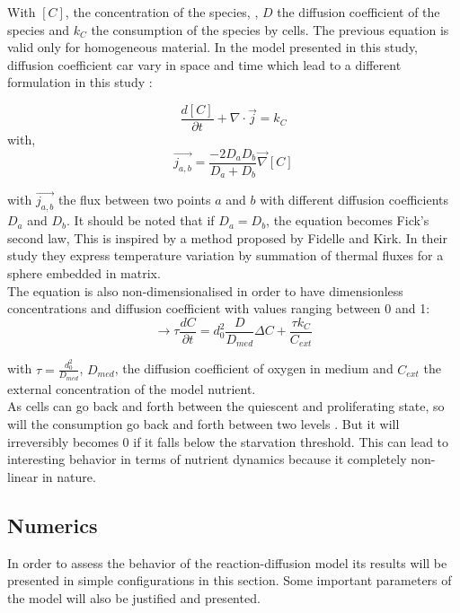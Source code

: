 \documentclass[11pt,a4paper]{article}
\begin{document}
With $[C]$, the concentration of the species, , $D$ the diffusion coefficient of the species and $k_C$ the consumption of the species by cells. The previous equation is valid only for homogeneous material. In the model presented in this study, diffusion coefficient car vary in space and time which lead to a different formulation in this study : 

\[ \frac{d [C]}{\partial t}  +   \nabla \cdot \vec{j} = k_C  \]
with, 
\[ \vec{j_{a,b}} = \frac{-2 D_{a}D_{b}}{D_{a} + D_{b}} \vec{\nabla}[C]  \]

with  $\vec{j_{a,b}}$ the flux between two points $a$ and $b$ with different diffusion coefficients $D_a$ and $D_b$. It should be noted that if $D_a = D_b$, the equation becomes Fick's second law, This is inspired by a method proposed by Fidelle and Kirk\cite{Fidelle1971}. In their study they express temperature variation by summation of thermal fluxes for a sphere embedded in matrix.\\

The equation is also non-dimensionalised in order to have dimensionless concentrations and diffusion coefficient with values ranging between 0 and 1:
\[ \rightarrow \tau \frac{d C}{\partial t}  =   d_0^2 \frac{D}{D_{med}} \Delta C + \frac{\tau k_C}{C_{ext}}  \]

 with $\tau  = \frac{d_0^2}{D_{med}}$, $D_{med}$, the diffusion coefficient of oxygen in medium and $C_{ext}$ the external concentration of the model nutrient.\\ %




As cells can go back and forth between the quiescent and proliferating state, so will the consumption go back and forth between two levels . But it will irreversibly becomes 0 if it falls below the starvation threshold. This can lead to interesting behavior in terms of nutrient dynamics because it completely non-linear in nature.\\

\subsection{Numerics}
In order to assess the behavior of the reaction-diffusion model its results will be presented in simple configurations in this section. Some important parameters of the model will also be justified and presented.\\
\end{document}
